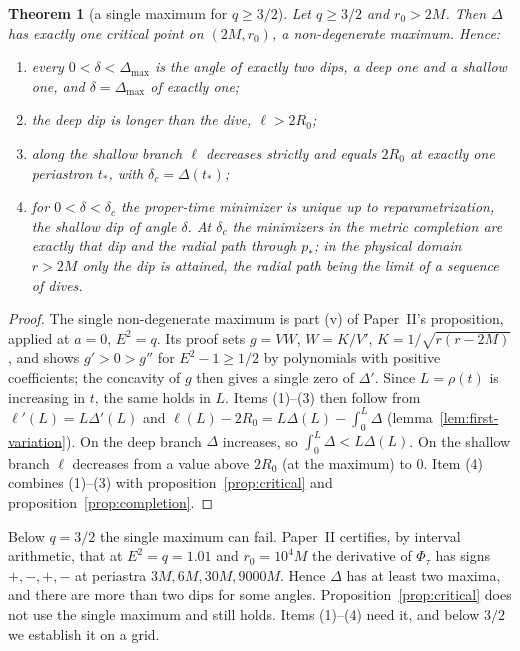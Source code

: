 \documentclass[aip,jmp,amsmath,amssymb,reprint]{revtex4-2}
\theoremstyle{plain}
\newtheorem{theorem}{Theorem}
\theoremstyle{definition}
\begin{document}
\begin{theorem}[a single maximum for $q\ge3/2$]\label{thm:single-max}
Let $q\ge3/2$ and $r_0>2M$. Then $\Delta$ has exactly one critical point on $(2M,r_0)$, a
non-degenerate maximum. Hence:
\begin{enumerate}
\item every $0<\delta<\Delta_{\max}$ is the angle of exactly two dips, a deep one and a
  shallow one, and $\delta=\Delta_{\max}$ of exactly one;
\item the deep dip is longer than the dive, $\ell>2R_0$;
\item along the shallow branch $\ell$ decreases strictly and equals $2R_0$ at exactly one
  periastron $t_*$, with $\delta_c=\Delta(t_*)$;
\item for $0<\delta<\delta_c$ the proper-time minimizer is unique up to reparametrization,
  the shallow dip of angle $\delta$. At $\delta_c$ the minimizers in the metric completion are
  exactly that dip and the radial path through $p_*$; in the physical domain $r>2M$ only the
  dip is attained, the radial path being the limit of a sequence of dives.
\end{enumerate}
\end{theorem}

\begin{proof}
The single non-degenerate maximum is part (v) of Paper~II's proposition, applied at $a=0$,
$E^2=q$. Its proof sets $g=VW$, $W=K/V'$, $K=1/\sqrt{r(r-2M)}$, and shows $g'>0>g''$ for
$E^2-1\ge1/2$ by polynomials with positive coefficients; the concavity of $g$ then gives a
single zero of $\Delta'$.
Since $L=\rho(t)$ is increasing in $t$, the same holds in $L$. Items (1)--(3) then follow from
$\ell'(L)=L\Delta'(L)$ and $\ell(L)-2R_0=L\Delta(L)-\int_0^L\Delta$
(lemma~\ref{lem:first-variation}). On the deep branch $\Delta$ increases, so
$\int_0^L\Delta<L\Delta(L)$. On the shallow branch $\ell$ decreases from a value above $2R_0$
(at the maximum) to $0$. Item (4) combines (1)--(3) with proposition~\ref{prop:critical} and
proposition~\ref{prop:completion}.
\end{proof}

Below $q=3/2$ the single maximum can fail. Paper~II certifies, by interval arithmetic, that
at $E^2=q=1.01$ and $r_0=10^4M$ the derivative of $\Phi_\tau$ has signs $+,-,+,-$ at
periastra $3M,6M,30M,9000M$. Hence $\Delta$ has at least two maxima, and there are more than
two dips for some angles. Proposition~\ref{prop:critical} does not use the single maximum
and still holds. Items (1)--(4) need it, and below $3/2$ we establish it on a grid.
\end{document}
